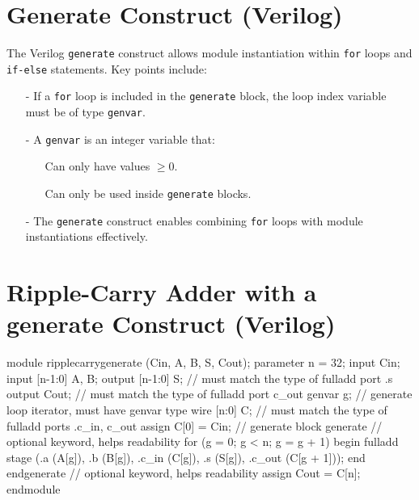 \documentclass[12pt,openany]{book}
\begin{document}
\section{Generate Construct (Verilog)}
The Verilog \texttt{generate} construct allows module instantiation within \texttt{for} loops and \texttt{if-else} statements. Key points include:

\begin{itemize}
    \item[-] If a \texttt{for} loop is included in the \texttt{generate} block, the loop index variable must be of type \texttt{genvar}.
    \item[-] A \texttt{genvar} is an integer variable that:
    \begin{itemize}
        \item[] Can only have values $\geq 0$.
        \item[] Can only be used inside \texttt{generate} blocks.
    \end{itemize}
    \item[-] The \texttt{generate} construct enables combining \texttt{for} loops with module instantiations effectively.
\end{itemize}
\vfill

\section{Ripple-Carry Adder with a generate Construct (Verilog)}

\begin{minipage}[htp]{1\textwidth}
	\begin{vhdl}
module ripplecarrygenerate (Cin, A, B, S, Cout);
	parameter n = 32;
	input Cin;
	input [n-1:0] A, B;
	output [n-1:0] S; // must match the type of fulladd port .s
	output Cout; // must match the type of fulladd port c_out
	genvar g; // generate loop iterator, must have genvar type
	wire [n:0] C; // must match the type of fulladd ports .c_in, c_out
	assign C[0] = Cin;
	// generate block
	generate // optional keyword, helps readability
	for (g = 0; g < n; g = g + 1) begin
	fulladd stage (.a (A[g]), .b (B[g]), .c_in (C[g]), .s (S[g]), .c_out (C[g + 1]));
	end
	endgenerate // optional keyword, helps readability
	assign Cout = C[n];
endmodule
	\end{vhdl}
\end{minipage}
\end{document}

